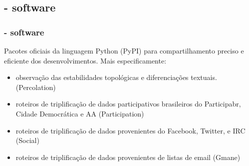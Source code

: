 \documentclass[10pt]{beamer}
\begin{document}
\begin{frame}
\subsection{- software}
\frametitle{- software}
Pacotes oficiais da linguagem Python (PyPI) para compartilhamento
preciso e eficiente dos desenvolvimentos. Mais especificamente:
	\begin{itemize}
		\item observação das estabilidades topológicas e diferenciações textuais. (Percolation)
		\item roteiros de triplificação de dados participativos brasileiros do Participabr, Cidade Democrática e AA (Participation)
		\item roteiros de triplificação de dados provenientes do Facebook, Twitter, e IRC (Social)
		\item roteiros de triplificação de dados provenientes de listas de email (Gmane)
	\end{itemize}
\end{frame}

\end{document}
